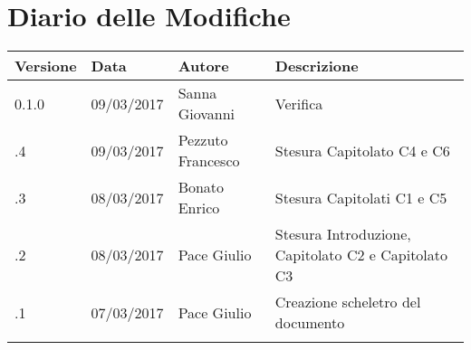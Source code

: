 \section*{Diario delle Modifiche}
\begin{longtabu} to \textwidth {
	X[4,l,p]
	X[4,l,p]
	X[4,l,p]
	X[8,l,p]}
	\toprule
		 Versione & Data & Autore & Descrizione \\
		\midrule
		\endhead
		0.1.0 & 09/03/2017 & Sanna Giovanni & Verifica\\
		\addlinespace[0.2em]
		\midrule
		.4 & 09/03/2017 & Pezzuto Francesco & Stesura Capitolato C4 e C6\\
		\addlinespace[0.2em]
		\midrule
		.3 & 08/03/2017 & Bonato Enrico & Stesura Capitolati C1 e C5\\
		\addlinespace[0.2em]
		\midrule
		.2 & 08/03/2017 & Pace Giulio & Stesura Introduzione, Capitolato C2 e Capitolato C3\\
		\addlinespace[0.2em]
		\midrule
		.1 & 07/03/2017 & Pace Giulio & Creazione scheletro del documento\\
		\addlinespace[0.4em]
		
	\bottomrule
\end{longtabu}